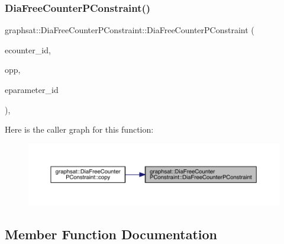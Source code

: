 \mbox{\label{classgraphsat_1_1_dia_free_counter_p_constraint_a22a0379a03b78ca68b7539befe0409f1}} 
\subsubsection{\texorpdfstring{DiaFreeCounterPConstraint()}{DiaFreeCounterPConstraint()}}
{\footnotesize\ttfamily graphsat\+::\+Dia\+Free\+Counter\+P\+Constraint\+::\+Dia\+Free\+Counter\+P\+Constraint (\begin{DoxyParamCaption}\item[{int}]{ecounter\+\_\+id,  }\item[{\mbox{\hyperlink{namespacegraphsat_acfb5939f9bdafbd9aea0d084b9a56f69}{C\+O\+M\+P\+\_\+\+O\+P\+E\+R\+A\+T\+OR}}}]{opp,  }\item[{int}]{eparameter\+\_\+id }\end{DoxyParamCaption})\hspace{0.3cm}{\ttfamily [inline]}, {\ttfamily [private]}}

Here is the caller graph for this function\+:
\nopagebreak
\begin{figure}[H]
\begin{center}
\leavevmode
\includegraphics[width=350pt]{classgraphsat_1_1_dia_free_counter_p_constraint_a22a0379a03b78ca68b7539befe0409f1_icgraph}
\end{center}
\end{figure}


\subsection{Member Function Documentation}
\mbox{\label{classgraphsat_1_1_dia_free_counter_p_constraint_a75e3eccebbe42daf47b10209f6ab0b59}} 
